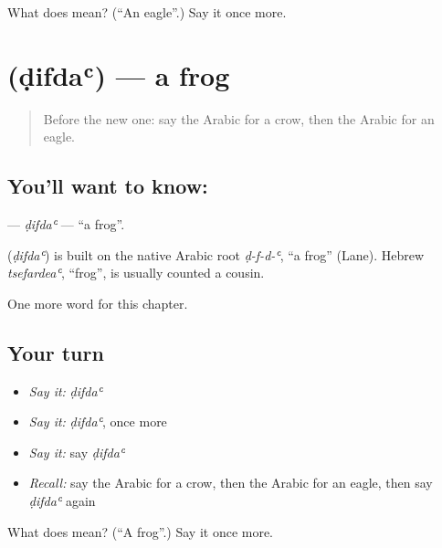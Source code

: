 \begin{tcolorbox}[breakable,colback=teal!4,colframe=teal!35!black,title={Before you move on}]
What does  mean? (\textquotedblleft{}An eagle\textquotedblright{}.) Say it once more.
\end{tcolorbox}
\section[\texorpdfstring{\ar{ضفدع} (ḍifdaʿ)}{ضفدع (ḍifdaʿ)}]{ (ḍifdaʿ) — a frog}

\label{lesson:AR-C138-difda}



\begin{quote}
Before the new one: say the Arabic for a crow, then the Arabic for an eagle.
\end{quote}

\subsection*{You'll want to know: }
\textbf{} — \emph{ḍifdaʿ} — \textquotedblleft{}a frog\textquotedblright{}.

\begin{cousinweb}
\textbf{} (\emph{ḍifdaʿ}) is built on the native Arabic root \emph{ḍ-f-d-ʿ}, \textquotedblleft{}a frog\textquotedblright{} (Lane). Hebrew \emph{tsefardeaʿ}, \textquotedblleft{}frog\textquotedblright{}, is usually counted a cousin.
\end{cousinweb}

\begin{grammarlens}[title={What you've built}]
One more word for this chapter.
\end{grammarlens}

\subsection*{Your turn}
\begin{itemize}
\raggedright
  \item \emph{Say it:} \emph{ḍifdaʿ}
  \item \emph{Say it:} \emph{ḍifdaʿ}, once more
  \item \emph{Say it:} say \emph{ḍifdaʿ}
  \item \emph{Recall:} say the Arabic for a crow, then the Arabic for an eagle, then say \emph{ḍifdaʿ} again
\end{itemize}

\begin{tcolorbox}[breakable,colback=teal!4,colframe=teal!35!black,title={Before you move on}]
What does  mean? (\textquotedblleft{}A frog\textquotedblright{}.) Say it once more.
\end{tcolorbox}
